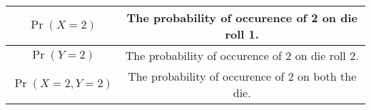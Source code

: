 \documentclass[journal,12pt,onecolumn]{IEEEtran}
\begin{document}
%


\newtheorem{theorem}{Theorem}[section]
\newtheorem{problem}{Problem}
\newtheorem{proposition}{Proposition}[section]
\newtheorem{lemma}{Lemma}[section]
\newtheorem{corollary}[theorem]{Corollary}
\newtheorem{example}{Example}[section]
\newtheorem{definition}[problem]{Definition}


\providecommand{\pr}[1]{\ensuremath{\Pr\left(#1\right)}}


\begin{center}
\begin{tabular}{|c|c|}
\hline
$\pr{X=2}$ & The probability of occurence of 2 on die roll 1. \\
\hline
$\pr{Y=2}$ & The probability of occurence of 2 on die roll 2. \\ 
\hline
 $\pr{X=2,Y=2}$ & The probability of occurence of 2 on both the die. \\
 \hline
 \end{tabular} 
 \end{center}
\end{document}
